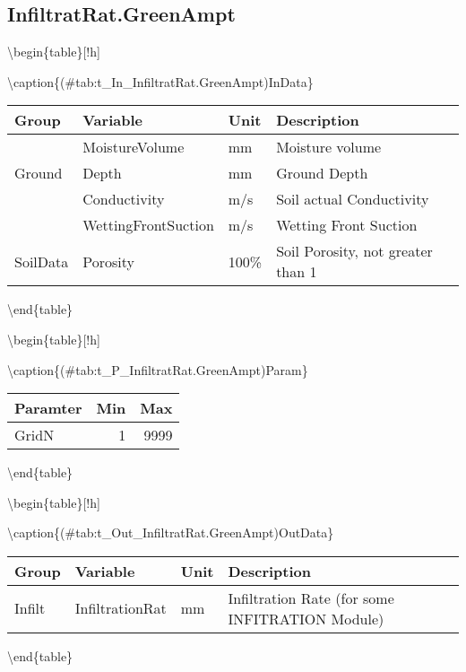 \documentclass[
]{book}
\begin{document}
\hypertarget{infiltratrat.greenampt}{%
\subsection{InfiltratRat.GreenAmpt}\label{infiltratrat.greenampt}}

\textbackslash begin\{table\}{[}!h{]}

\textbackslash caption\{(\#tab:t\_In\_InfiltratRat.GreenAmpt)InData\}
\centering

\begin{tabular}[t]{l|l|l|l}
\hline
Group & Variable & Unit & Description\\
\hline
 & MoistureVolume & mm & Moisture volume\\
\cline{2-4}
\multirow{-2}{*}{\raggedright\arraybackslash Ground} & Depth & mm & Ground Depth\\
\cline{1-4}
 & Conductivity & m/s & Soil actual Conductivity\\
\cline{2-4}
 & WettingFrontSuction & m/s & Wetting Front Suction\\
\cline{2-4}
\multirow{-3}{*}{\raggedright\arraybackslash SoilData} & Porosity & 100\% & Soil Porosity, not greater than 1\\
\hline
\end{tabular}

\textbackslash end\{table\}

\textbackslash begin\{table\}{[}!h{]}

\textbackslash caption\{(\#tab:t\_P\_InfiltratRat.GreenAmpt)Param\}
\centering

\begin{tabular}[t]{l|r|r}
\hline
Paramter & Min & Max\\
\hline
GridN & 1 & 9999\\
\hline
\end{tabular}

\textbackslash end\{table\}

\textbackslash begin\{table\}{[}!h{]}

\textbackslash caption\{(\#tab:t\_Out\_InfiltratRat.GreenAmpt)OutData\}
\centering

\begin{tabular}[t]{l|l|l|l}
\hline
Group & Variable & Unit & Description\\
\hline
Infilt & InfiltrationRat & mm & Infiltration Rate (for some INFITRATION Module)\\
\hline
\end{tabular}

\textbackslash end\{table\}
\end{document}
